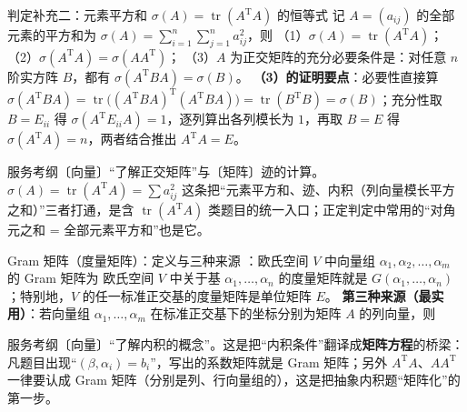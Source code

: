 \begin{fdeep}{判定补充二：元素平方和 $\sigma(A)=\operatorname{tr}(A^{\mathrm T}A)$ 的恒等式}
记 $A=(a_{ij})$ 的全部元素的平方和为 $\sigma(A)=\sum_{i=1}^{n}\sum_{j=1}^{n}a_{ij}^{2}$，则
（1）$\sigma(A)=\operatorname{tr}(A^{\mathrm T}A)$；
（2）$\sigma(A^{\mathrm T}A)=\sigma(AA^{\mathrm T})$；
（3）$A$ 为正交矩阵的充分必要条件是：对任意 $n$ 阶实方阵 $B$，都有 $\sigma(A^{\mathrm T}BA)=\sigma(B)$。
\textbf{（3）的证明要点}：必要性直接算
$\sigma(A^{\mathrm T}BA)=\operatorname{tr}\bigl((A^{\mathrm T}BA)^{\mathrm T}(A^{\mathrm T}BA)\bigr)=\operatorname{tr}(B^{\mathrm T}B)=\sigma(B)$；充分性取 $B=E_{ii}$ 得 $\sigma(A^{\mathrm T}E_{ii}A)=1$，逐列算出各列模长为 $1$，再取 $B=E$ 得 $\sigma(A^{\mathrm T}A)=n$，两者结合推出 $A^{\mathrm T}A=E$。

\fbref{}服务考纲〔向量〕“了解正交矩阵”与〔矩阵〕迹的计算。$\sigma(A)=\operatorname{tr}(A^{\mathrm T}A)=\sum a_{ij}^{2}$ 这条把“元素平方和、迹、内积（列向量模长平方之和）”三者打通，是含 $\operatorname{tr}(A^{\mathrm T}A)$ 类题目的统一入口；正定判定中常用的“对角元之和 = 全部元素平方和”也是它。
\end{fdeep}

\begin{fdeep}{Gram 矩阵（度量矩阵）：定义与三种来源}
：欧氏空间 $V$ 中向量组 $\alpha_{1},\alpha_{2},\dots,\alpha_{m}$ 的 Gram 矩阵为
欧氏空间 $V$ 中关于基 $\alpha_{1},\dots,\alpha_{n}$ 的度量矩阵就是 $G(\alpha_{1},\dots,\alpha_{n})$；特别地，$V$ 的任一标准正交基的度量矩阵是单位矩阵 $E$。
\textbf{第三种来源（最实用）}：若向量组 $\alpha_{1},\dots,\alpha_{m}$ 在标准正交基下的坐标分别为矩阵 $A$ 的列向量，则

\fbref{}服务考纲〔向量〕“了解内积的概念”。这是把“内积条件”翻译成\textbf{矩阵方程}的桥梁：凡题目出现“$(\beta,\alpha_{i})=b_{i}$”，写出的系数矩阵就是 Gram 矩阵；另外 $A^{\mathrm T}A$、$AA^{\mathrm T}$ 一律要认成 Gram 矩阵（分别是列、行向量组的），这是把抽象内积题“矩阵化”的第一步。
\end{fdeep}

